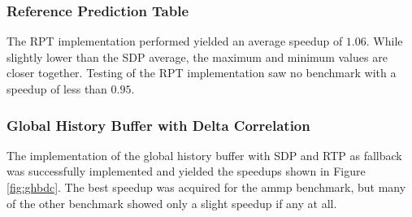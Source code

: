 \subsubsection{Reference Prediction Table}
The RPT implementation performed yielded an average speedup of $1.06$.
While slightly lower than the SDP average, the maximum and minimum values are closer together.
Testing of the RPT implementation saw no benchmark with a speedup of less than $0.95$.


\subsubsection{Global History Buffer with Delta Correlation}
The implementation of the global history buffer with SDP and RTP as fallback was successfully implemented and yielded the speedups shown in Figure \ref{fig:ghbdc}.
The best speedup was acquired for the ammp benchmark, but many of the other benchmark showed only a slight speedup if any at all.


\begin{figure*}
    \label{fig:ghbdc}
    
    \caption{Speedup of each benchmark as a function of degree for the global history buffer with delta correlation and fall back to SDP and RTP.}
\end{figure*}
